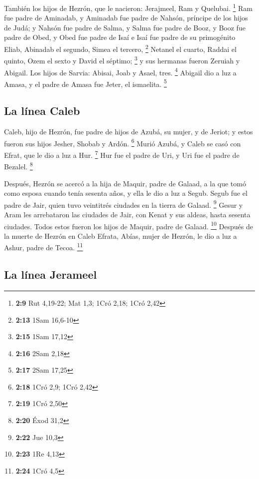 \begin{paracol}{2}
 También los hijos de Hezrón, que le nacieron: Jerajmeel,
Ram y Quelubai. \footnote{\textbf{2:9} Rut 4,19-22; Mat 1,3; 1Cró 2,18;
  1Cró 2,42}  Ram fue padre de Aminadab, y Aminadab fue
padre de Nahsón, príncipe de los hijos de Judá;  y Nahsón
fue padre de Salma, y Salma fue padre de Booz,  y Booz
fue padre de Obed, y Obed fue padre de Isaí  e Isaí fue
padre de su primogénito Eliab, Abinadab el segundo, Simea el tercero,
\footnote{\textbf{2:13} 1Sam 16,6-10}  Netanel el cuarto,
Raddai el quinto,  Ozem el sexto y David el séptimo;
\footnote{\textbf{2:15} 1Sam 17,12}  y sus hermanas
fueron Zeruiah y Abigail. Los hijos de Sarvia: Abisai, Joab y Asael,
tres. \footnote{\textbf{2:16} 2Sam 2,18}  Abigail dio a
luz a Amasa, y el padre de Amasa fue Jeter, el ismaelita. \footnote{\textbf{2:17}
  2Sam 17,25}

\hypertarget{la-luxednea-caleb}{%
\subsection{La línea Caleb}\label{la-luxednea-caleb}}

 Caleb, hijo de Hezrón, fue padre de hijos de Azubá, su
mujer, y de Jeriot; y estos fueron sus hijos Jesher, Shobab y Ardón.
\footnote{\textbf{2:18} 1Cró 2,9; 1Cró 2,42}  Murió
Azubá, y Caleb se casó con Efrat, que le dio a luz a Hur. \footnote{\textbf{2:19}
  1Cró 2,50}  Hur fue el padre de Uri, y Uri fue el padre
de Bezalel. \footnote{\textbf{2:20} Éxod 31,2}

 Después, Hezrón se acercó a la hija de Maquir, padre de
Galaad, a la que tomó como esposa cuando tenía sesenta años, y ella le
dio a luz a Segub.  Segub fue el padre de Jair, quien
tuvo veintitrés ciudades en la tierra de Galaad. \footnote{\textbf{2:22}
  Jue 10,3}  Gesur y Aram les arrebataron las ciudades de
Jair, con Kenat y sus aldeas, hasta sesenta ciudades. Todos estos fueron
los hijos de Maquir, padre de Galaad. \footnote{\textbf{2:23} 1Re 4,13}
 Después de la muerte de Hezrón en Caleb Efrata, Abías,
mujer de Hezrón, le dio a luz a Ashur, padre de Tecoa. \footnote{\textbf{2:24}
  1Cró 4,5}

\hypertarget{la-luxednea-jerameel}{%
\subsection{La línea Jerameel}\label{la-luxednea-jerameel}}


\end{paracol}
